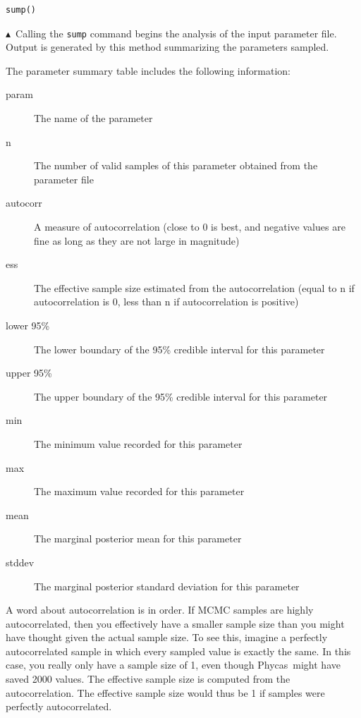 \documentclass[10pt]{article}
\newcommand{\cmd}[1]{{\tt \small #1}\index{#1}}	%
\newcommand{\phycas}{{\sc Phycas}\index{Phycas}}
\newcommand{\pointup}{$\blacktriangle$}
\newcommand{\indexed}[1]{#1\index{#1}}
\begin{document}
\begin{samepage}
\begin{verbatim}
sump()
\end{verbatim}
\pointup\ Calling the \cmd{sump} command begins the analysis of the input parameter file. Output is generated by this method summarizing the parameters sampled.
\end{samepage}
The parameter summary table includes the following information:
\begin{description}
\item[param] The name of the parameter
\item[n] The number of valid samples of this parameter obtained from the parameter file
\item[autocorr] A measure of autocorrelation (close to 0 is best, and negative values are fine as long as they are not large in magnitude)
\item[ess] The effective sample size estimated from the autocorrelation (equal to n if autocorrelation is 0, less than n if autocorrelation is positive)
\item[lower 95\%] The lower boundary of the 95\% credible interval for this parameter
\item[upper 95\%] The upper boundary of the 95\% credible interval for this parameter
\item[min] The minimum value recorded for this parameter
\item[max]  The maximum value recorded for this parameter
\item[mean]  The marginal posterior mean for this parameter
\item[stddev] The marginal posterior standard deviation for this parameter
\end{description}

A word about \indexed{autocorrelation} is in order. If MCMC samples are highly autocorrelated, then you effectively have a smaller sample size than you might have thought given the actual sample size. To see this, imagine a perfectly autocorrelated sample in which every sampled value is exactly the same. In this case, you really only have a sample size of 1, even though \phycas\ might have saved 2000 values. The effective sample size is computed from the autocorrelation. The effective sample size would thus be 1 if samples were perfectly autocorrelated.
\end{document}
